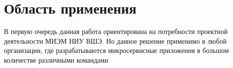 \section{Область применения}
\label{sec:appl-area}

В первую очередь данная работа ориентирована на потребности проектной деятельности МИЭМ НИУ ВШЭ. Но данное решение применимо в любой организации, где разрабатываются микросервисные приложения в большом количестве различными командами

